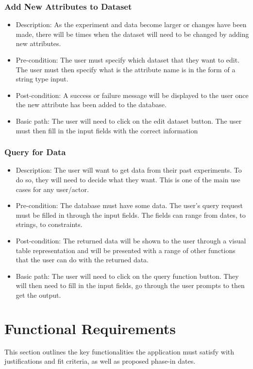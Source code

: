 \documentclass[12pt]{article}
\begin{document}
\subsubsection{Add New Attributes to Dataset}
\begin{itemize}
  \item Description: As the experiment and data become larger or changes have
  been made, there will be times when the dataset will need to be changed by
  adding new attributes.  
  \item Pre-condition: The user must specify which dataset that they want to
  edit. The user must then specify what is the attribute name is in the form of
  a string type input. 
  \item Post-condition: A success or failure message will be displayed to the
  user once the new attribute has been added to the database. 
  \item Basic path: The user will need to click on the edit dataset button. The
  user must then fill in the input fields with the correct information
\end{itemize}

\subsubsection{Query for Data}
\begin{itemize}
  \item Description: The user will want to get data from their past experiments.
  To do so, they will need to decide what they want. This is one of the main use
  cases for any user/actor. 
  \item Pre-condition: The database must have some data. The user's query
  request must be filled in through the input fields. The fields can range from
  dates, to strings, to constraints. 
  \item Post-condition: The returned data will be shown to the user through a
  visual table representation and will be presented with a range of other
  functions that the user can do with the returned data.  
  \item Basic path: The user will need to click on the query function button.
  They will then need to fill in the input fields, go through the user prompts
  to then get the output.
\end{itemize}

\section{Functional Requirements}
This section outlines the key functionalities the application must satisfy with justifications and fit criteria, as well as proposed phase-in dates.
\end{document}
